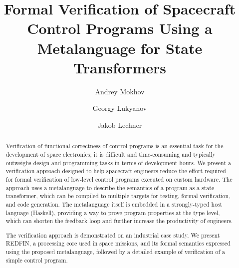 \documentclass[sigplan,10pt,review,anonymous]{acmart}
\begin{document}
\title{$\!\!\!$Formal Verification of Spacecraft Control Programs$\!\!\!$ Using a Metalanguage for State Transformers}

\author{Andrey Mokhov}
\author{Georgy Lukyanov}
\author{Jakob Lechner}

{
   \fancyhf{}
   \renewcommand{\headrulewidth}{0.2pt}
}

\begin{abstract}
Verification of functional correctness of control programs is an essential task
for the development of space electronics; it is difficult and time-consuming and
typically outweighs design and programming tasks in terms of development hours.
We present a verification approach designed to help spacecraft engineers reduce
the effort required for formal verification of low-level control programs executed
on custom hardware. The approach uses a metalanguage to describe the semantics
of a program as a state transformer, which can be compiled to multiple targets
for testing, formal verification, and code generation. The metalanguage itself
is embedded in a strongly-typed host language (Haskell), providing a way to prove
program properties at the type level, which can shorten the feedback loop and
further increase the productivity of engineers.

The verification approach is demonstrated on an industrial case study.
We present REDFIN, a processing core used in space missions, and its formal
semantics expressed using the proposed metalanguage, followed by a detailed
example of verification of a simple control program.

\end{abstract}

\maketitle
\end{document}

